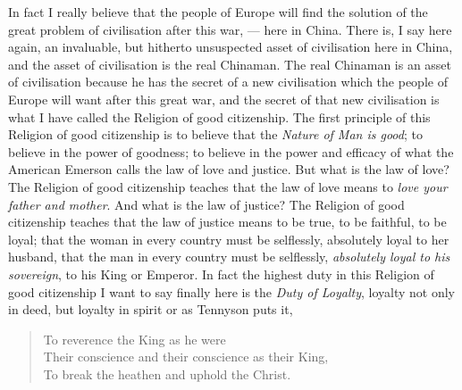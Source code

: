 In fact I really believe that the people of Europe will find the solution of the great problem of civilisation after this war, --- here in China. 
There is, I say here again, an invaluable, but hitherto unsuspected asset of civilisation here in China, and the asset of civilisation is the real Chinaman. 
The real Chinaman is an asset of civilisation because he has the secret of a new civilisation which the people of Europe will want after this great war, and the secret of that new civilisation is what I have called the Religion of good citizenship. 
The first principle of this Religion of good citizenship is to believe that the \emph{Nature of Man is good}; to believe in the power of goodness; to believe in the power and efficacy of what the American Emerson calls the law of love and justice. 
But what is the law of love? The Religion of good citizenship teaches that the law of love means to \emph{love your father and mother}. 
And what is the law of justice? 
The Religion of good citizenship teaches that the law of justice means to be true, to be faithful, to be loyal; that the woman in every country must be selflessly, absolutely loyal to her husband, that the man in every country must be selflessly, \emph{absolutely loyal to his sovereign}, to his King or Emperor. 
In fact the highest duty in this Religion of good citizenship I want to say finally here is the \emph{Duty of Loyalty}, loyalty not only in deed, but loyalty in spirit or as Tennyson puts it,
\begin{quote}\footnotesize
    To reverence the King as he were\\
    Their conscience and their conscience as their King,\\
    To break the heathen and uphold the Christ.\\
\end{quote}

